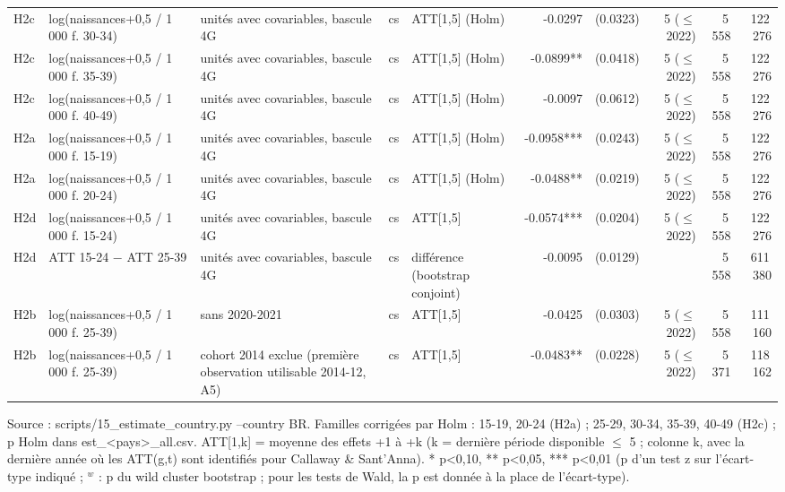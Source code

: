 \begin{table}
\begin{threeparttable}
\begin{tabular}{lp{4.4cm}p{5.7cm}lp{3.9cm}rrrrr}
H2c & log(naissances+0,5 / 1 000 f. 30-34) & unités avec covariables, bascule 4G & cs & ATT[1,5] (Holm) & -0.0297 & (0.0323) & 5 ($\leq$ 2022) & 5\,558 & 122\,276 \\
H2c & log(naissances+0,5 / 1 000 f. 35-39) & unités avec covariables, bascule 4G & cs & ATT[1,5] (Holm) & -0.0899** & (0.0418) & 5 ($\leq$ 2022) & 5\,558 & 122\,276 \\
H2c & log(naissances+0,5 / 1 000 f. 40-49) & unités avec covariables, bascule 4G & cs & ATT[1,5] (Holm) & -0.0097 & (0.0612) & 5 ($\leq$ 2022) & 5\,558 & 122\,276 \\
H2a & log(naissances+0,5 / 1 000 f. 15-19) & unités avec covariables, bascule 4G & cs & ATT[1,5] (Holm) & -0.0958*** & (0.0243) & 5 ($\leq$ 2022) & 5\,558 & 122\,276 \\
H2a & log(naissances+0,5 / 1 000 f. 20-24) & unités avec covariables, bascule 4G & cs & ATT[1,5] (Holm) & -0.0488** & (0.0219) & 5 ($\leq$ 2022) & 5\,558 & 122\,276 \\
H2d & log(naissances+0,5 / 1 000 f. 15-24) & unités avec covariables, bascule 4G & cs & ATT[1,5] & -0.0574*** & (0.0204) & 5 ($\leq$ 2022) & 5\,558 & 122\,276 \\
H2d & ATT 15-24 $-$ ATT 25-39 & unités avec covariables, bascule 4G & cs & différence (bootstrap conjoint) & -0.0095 & (0.0129) &  & 5\,558 & 611\,380 \\
H2b & log(naissances+0,5 / 1 000 f. 25-39) & sans 2020-2021 & cs & ATT[1,5] & -0.0425 & (0.0303) & 5 ($\leq$ 2022) & 5\,558 & 111\,160 \\
H2b & log(naissances+0,5 / 1 000 f. 25-39) & cohort 2014 exclue (première observation utilisable 2014-12, A5) & cs & ATT[1,5] & -0.0483** & (0.0228) & 5 ($\leq$ 2022) & 5\,371 & 118\,162 \\
\bottomrule
\end{tabular}
\begin{tablenotes}\footnotesize
\item Source : scripts/15\_estimate\_country.py --country BR. Familles corrigées par Holm : 15-19, 20-24 (H2a) ; 25-29, 30-34, 35-39, 40-49 (H2c) ; p Holm dans est\_<pays>\_all.csv. ATT[1,k] = moyenne des effets +1 à +k (k = dernière période disponible $\leq$ 5 ; colonne k, avec la dernière année où les ATT(g,t) sont identifiés pour Callaway \& Sant'Anna). * p<0,10, ** p<0,05, *** p<0,01 (p d'un test z sur l'écart-type indiqué ; $^{w}$ : p du wild cluster bootstrap ; pour les tests de Wald, la p est donnée à la place de l'écart-type).
\end{tablenotes}
\end{threeparttable}
\end{table}
